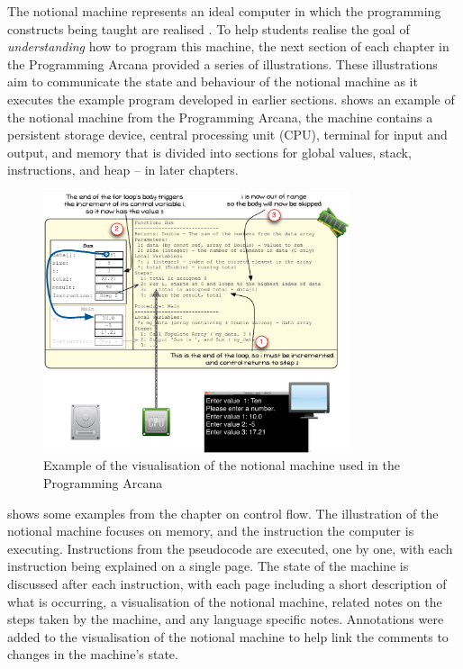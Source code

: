 The notional machine represents an ideal computer in which the programming constructs being taught are realised \cite{DuBoulay:1986}. To help students realise the goal of \emph{understanding} how to program this machine, the next section of each chapter in the Programming Arcana provided a series of illustrations. These illustrations aim to communicate the state and behaviour of the notional machine as it executes the example program developed in earlier sections.  shows an example of the notional machine from the Programming Arcana, the machine contains a persistent storage device, central processing unit (CPU), terminal for input and output, and memory that is divided into sections for global values, stack, instructions, and heap -- in later chapters. 

\begin{figure}[p]
  \centering
  \includegraphics[width=0.8\textwidth]{NotionalMachine}
  \caption{Example of the visualisation of the notional machine used in the Programming Arcana}
  \label{fig:notional_machine}
\end{figure}


 shows some examples from the chapter on control flow. The illustration of the notional machine focuses on memory, and the instruction the computer is executing. Instructions from the pseudocode are executed, one by one, with each instruction being explained on a single page. The state of the machine is discussed after each instruction, with each page including a short description of what is occurring, a visualisation of the notional machine, related notes on the steps taken by the machine, and any language specific notes. Annotations were added to the visualisation of the notional machine to help link the comments to changes in the machine's state.

